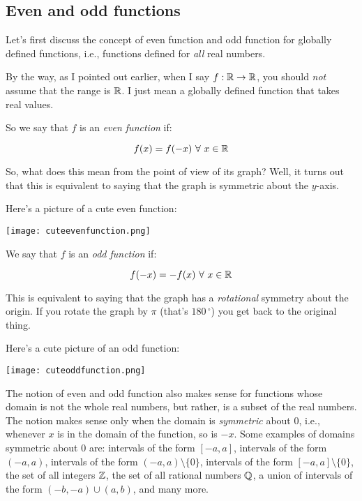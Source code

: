 \documentclass{amsart}
\begin{document}
\subsection{Even and odd functions}

Let's first discuss the concept of even function and odd function for
globally defined functions, i.e., functions defined for {\em all} real
numbers.

By the way, as I pointed out earlier, when I say $f:\mathbb{R} \to \mathbb{R}$, you
should {\em not} assume that the range is $\mathbb{R}$. I just mean a globally
defined function that takes real values.

So we say that $f$ is an {\em even function} if:

\begin{equation*}
  f(x) = f(-x) \ \forall \ x \in \mathbb{R}
\end{equation*}

So, what does this mean from the point of view of its graph? Well, it
turns out that this is equivalent to saying that the graph is
symmetric about the $y$-axis.

Here's a picture of a cute even function:

\texttt{[image: cuteevenfunction.png]}

We say that $f$ is an {\em odd function} if:

\begin{equation*}
  f(-x) = -f(x) \ \forall \ x \in \mathbb{R}
\end{equation*}

This is equivalent to saying that the graph has a {\em
rotational} symmetry about the origin. If you rotate the graph by
$\pi$ (that's $180\,^\circ$) you get back to the original thing.

Here's a cute picture of an odd function:

\texttt{[image: cuteoddfunction.png]}

The notion of even and odd function also makes sense for functions
whose domain is not the whole real numbers, but rather, is a subset of
the real numbers. The notion makes sense only when the domain is {\em
symmetric} about $0$, i.e., whenever $x$ is in the domain of the
function, so is $-x$. Some examples of domains symmetric about $0$
are: intervals of the form $[-a,a]$, intervals of the form $(-a,a)$,
intervals of the form $(-a,a) \setminus \{ 0 \}$, intervals of the
form $[-a,a] \setminus \{ 0 \}$, the set of all integers $\mathbb{Z}$, the set
of all rational numbers $\mathbb{Q}$, a union of intervals of the form
$(-b,-a) \cup (a,b)$, and many more.
\end{document}
